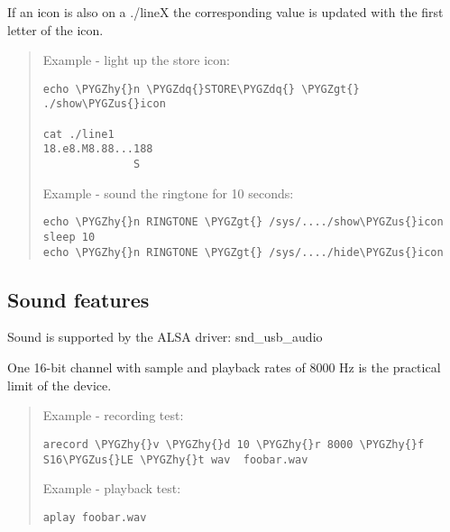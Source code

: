 \documentclass[a4paper,8pt,english]{sphinxmanual}
\def\PYGZus{\char`\_}
\def\PYGZgt{\char`\>}
\def\PYGZhy{\char`\-}
\def\PYGZdq{\char`\"}
\begin{document}
If an icon is also on a ./lineX the corresponding value is
updated with the first letter of the icon.
\begin{quote}

Example - light up the store icon:

\begin{Verbatim}[commandchars=\\\{\}]
echo \PYGZhy{}n \PYGZdq{}STORE\PYGZdq{} \PYGZgt{} ./show\PYGZus{}icon

cat ./line1
18.e8.M8.88...188
              S
\end{Verbatim}

Example - sound the ringtone for 10 seconds:

\begin{Verbatim}[commandchars=\\\{\}]
echo \PYGZhy{}n RINGTONE \PYGZgt{} /sys/..../show\PYGZus{}icon
sleep 10
echo \PYGZhy{}n RINGTONE \PYGZgt{} /sys/..../hide\PYGZus{}icon
\end{Verbatim}
\end{quote}


\subsection{Sound features}
\label{input/devices/yealink:sound-features}
Sound is supported by the ALSA driver: snd\_usb\_audio

One 16-bit channel with sample and playback rates of 8000 Hz is the practical
limit of the device.
\begin{quote}

Example - recording test:

\begin{Verbatim}[commandchars=\\\{\}]
arecord \PYGZhy{}v \PYGZhy{}d 10 \PYGZhy{}r 8000 \PYGZhy{}f S16\PYGZus{}LE \PYGZhy{}t wav  foobar.wav
\end{Verbatim}

Example - playback test:

\begin{Verbatim}[commandchars=\\\{\}]
aplay foobar.wav
\end{Verbatim}
\end{quote}
\end{document}
